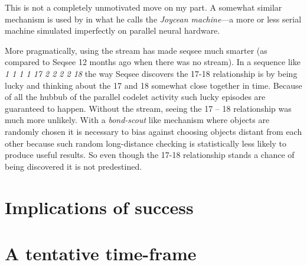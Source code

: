 \documentclass[letterpaper]{article}
\begin{document}
This is not a completely unmotivated move on my part.  A somewhat similar mechanism is used by  in what he calls the \emph{Joycean machine}---a more or less serial machine simulated imperfectly on parallel neural hardware.

More pragmatically, using the stream has made seqsee much smarter (as compared to Seqsee 12 months ago when there was no stream).  In a sequence like \emph{1 1 1 1 17 2 2 2 2 18} the way Seqsee discovers the 17-18 relationship is by being lucky and thinking about the 17 and 18 somewhat close together in time.  Because of all the hubbub of the parallel codelet activity such lucky episodes are guaranteed to happen.  Without the stream, seeing the 17 -- 18 relationship was much more unlikely.  With a \emph{bond-scout} like mechanism where objects are randomly chosen it is necessary to bias against choosing objects distant from each other because such random long-distance checking is statistically less likely to produce useful results.  So even though the 17-18 relationship stands a chance of being discovered it is not predestined.


\section{Implications of success}
\section{A tentative time-frame}


\printindex
\end{document}
